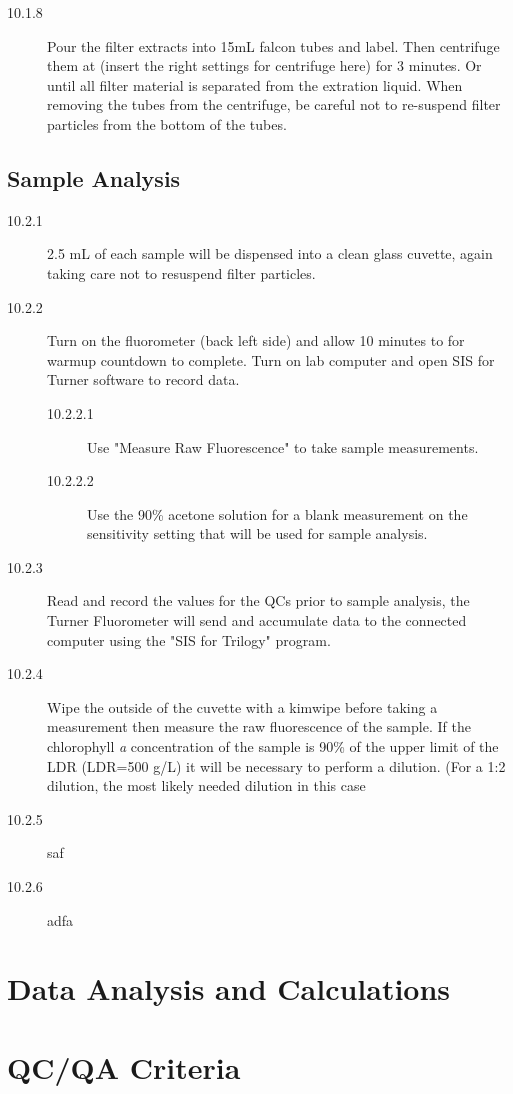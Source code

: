 \documentclass[12pt]{../SOP2}
\begin{document}
\begin{description}
\item[10.1.8] Pour the filter extracts into 15mL falcon tubes and label. Then centrifuge them at (insert the right settings for centrifuge here) for 3 minutes. Or until all filter material is separated from the extration liquid. When removing the tubes from the centrifuge, be careful not to re-suspend filter particles from the bottom of the tubes.
\end{description}

\subsection{Sample Analysis}
\begin{description}
\item[10.2.1] 2.5 mL of each sample will be dispensed into a clean glass cuvette, again taking care not to resuspend filter particles. 
\item[10.2.2] Turn on the fluorometer (back left side) and allow 10 minutes to for warmup countdown to complete. Turn on lab computer and open SIS for Turner software to record data. 
\begin{description}
\item[10.2.2.1] Use "Measure Raw Fluorescence" to take sample measurements.
\item[10.2.2.2] Use the 90\% acetone solution for a blank measurement on the sensitivity setting that will be used for sample analysis. %
\end{description}
\item[10.2.3] Read and record the values for the QCs prior to sample analysis, the Turner Fluorometer will send and accumulate data to the connected computer using the "SIS for Trilogy" program.
\item[10.2.4] Wipe the outside of the cuvette with a kimwipe before taking a measurement then measure the raw fluorescence of the sample. If the chlorophyll \textit{a} concentration of the sample is 90\% of the upper limit of the LDR (LDR=500 \micro g/L) it will be necessary to perform a dilution. (For a 1:2 dilution, the most likely needed dilution in this case %
\item[10.2.5] saf
\item[10.2.6] adfa
\end{description}

\section{Data Analysis and Calculations}

\section{QC/QA Criteria}
\end{document}
